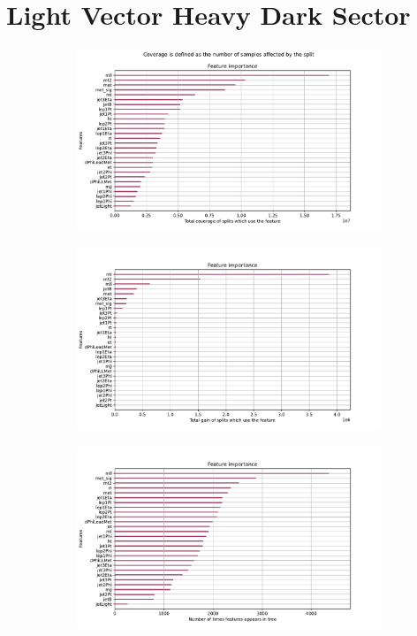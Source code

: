 \documentclass[12pt, a4paper]{book}
\begin{document}
\section{Light Vector Heavy Dark Sector}
\begin{figure}[!ht]
	\centering
	\begin{subfigure}[b]{0.7\textwidth}
      \centering
      \includegraphics[width=1\textwidth]{XGBoost/LV_HDS/feature_importance/total_cover.pdf}
      \end{subfigure}
      \hfill
      \begin{subfigure}[b]{0.7\textwidth}
         \centering
         \includegraphics[width=1\textwidth]{XGBoost/LV_HDS/feature_importance/total_gain.pdf}
      \end{subfigure}
      \hfill
      \begin{subfigure}[b]{0.7\textwidth}
         \centering
         \includegraphics[width=1\textwidth]{XGBoost/LV_HDS/feature_importance/weight.pdf}

\end{subfigure}
\end{figure}
\end{document}
